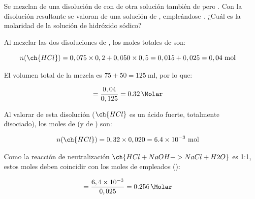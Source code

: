 \begin{exercise}
    Se mezclan  de una disolución de   con  de otra solución también de  pero . Con la disolución resultante se valoran  de una solución de , empleándose . ¿Cuál es la molaridad de la solución de hidróxido sódico?
    \begin{solu}

        Al mezclar las dos disoluciones de , los moles totales de  son:

        \begin{equation*}
            n(\ch{HCl}) = 0,075 \times 0,2 + 0,050 \times 0,5 = 0,015 + 0,025 = 0,04 \ \text{mol}
        \end{equation*}

        El volumen total de la mezcla es \(75+50 = \SI{125}{\milli\litre}\), por lo que:

        \begin{equation*}
            [\ch{HCl}] = \dfrac{0,04}{0,125} = \SI{0.32}{\Molar}
        \end{equation*}

        Al valorar  de esta disolución (\(\ch{HCl}\) es un ácido fuerte, totalmente disociado), los moles de  (y de ) son:

        \begin{equation*}
            n(\ch{HCl}) = 0,32 \times 0,020 = \num{6.4e-3} \ \text{mol}
        \end{equation*}

        Como la reacción de neutralización \(\ch{HCl + NaOH -> NaCl + H2O}\) es 1:1, estos moles deben coincidir con los moles de  empleados ():

        \begin{equation*}
            [\ch{NaOH}] = \dfrac{6,4 \times 10^{-3}}{0,025} = \SI{0.256}{\Molar}
        \end{equation*}

    \end{solu}
\end{exercise}


